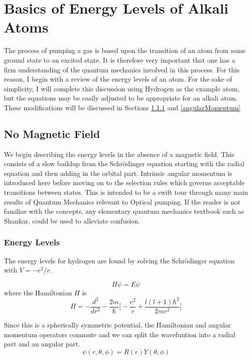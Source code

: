 \documentclass[letter,12pt]{article}
\newcommand{\schr}{Schr\"odinger}
\begin{document}
\section{Basics of Energy Levels of Alkali Atoms}
The process of pumping a gas is based upon the transition
of an atom from some ground state to an excited state. 
It is therefore very important that one has a firm 
understanding of the quantum mechanics involved in this 
process. For this reason, I begin with a review of the energy
levels of an atom. For the sake of simplicity, I will complete
this discussion using
Hydrogen as the example atom, but the equations may be 
easily adjusted to be appropriate for an alkali atom.
These modifications will be discussed in Sections \ref{energyLevels}
and \ref{angularMomentum}
	\subsection{No Magnetic Field}
    We begin describing the energy levels in the absence of 
    a magnetic field. This consists of a slow buildup 
    from the Schr\"odinger equation starting with the radial
    equation and then adding in the orbital part. Intrinsic 
    angular momentum is introduced here before moving on to
    the selection rules which governs acceptable transitions
    between states. This is intended to be a swift tour through
	many main results of Quantum Mechanics relevant to 
	Optical pumping. If the reader is not familiar with the 
	concepts, any elementary quantum mechanics textbook
	such as Shankar, could be used to alleviate confusion.
		\subsubsection{Energy Levels}\label{energyLevels}
		The energy levels for hydrogen are found by solving the
		{\schr} equation with $V=-e^2/r$. 

		\begin{equation}
		  H\psi = E\psi
		\end{equation}
		where the Hamiltonian $H$ is 
		\begin{equation}
			H=-\frac{d^2}{dr^2}-\frac{2m}{\hbar}\Big[-\frac{e^2}{r} + \frac{l(l+1)\hbar^2}{2mr^2}\Big]
		\end{equation}
		
		Since this is a spherically
		symmetric potential, the Hamiltonian and angular momentum
		operators commute and we can split the wavefuntion into a
		radial part and an angular part. 
		\begin{equation}
			\psi(r,\theta,\phi)=R(r)Y(\theta,\phi)
		\end{equation}
\end{document}
